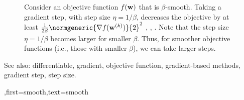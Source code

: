 {{\begin{figure}[H]
\begin{center}
	    	\end{center}
	    	\caption{Consider an objective function $f({\bf w})$ that is $\beta$-smooth. 
	    		Taking a gradient step, with step size $\eta = 1/\beta$, decreases the 
	    		objective by at least $\frac{1}{2\beta}\normgeneric{\nabla f({\bf w}^{(k)})}{2}^{2}$ \cite{nesterov04}, \cite{CvxBubeck2015}, \cite{CvxAlgBertsekas}. 
	    		Note that the step size $\eta = 1/\beta$ becomes larger for smaller $\beta$. Thus, 
	    		for smoother objective functions (i.e., those with smaller $\beta$), 
				we can take larger steps. \label{fig_gd_smooth_dict}}
	    	\end{figure}
		See also: differentiable, gradient, objective function, gradient-based methods, gradient step, step size.
	    },first={smooth},text={smooth}}

